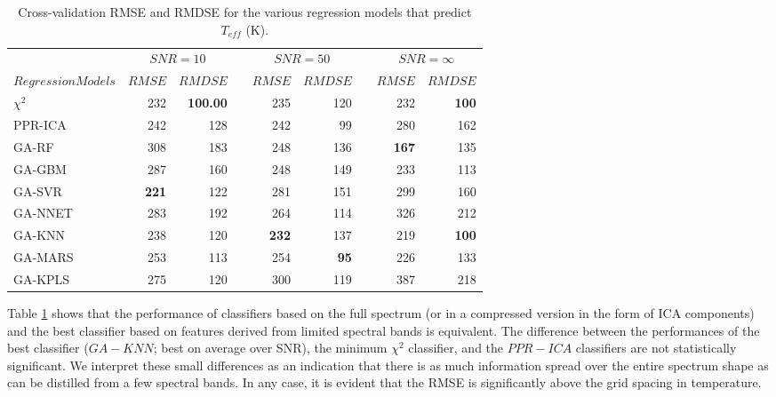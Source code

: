 \newcommand{\ra}[1]{\renewcommand{\arraystretch}{#1}}
\begin{table}\centering
\ra{1.3}
\begin{tabular}{@{}lrrcrrcrr@{}}\toprule
& \multicolumn{2}{c}{$SNR = 10$} & \phantom{ab}& \multicolumn{2}{c}{$SNR = 50$} &
\phantom{ab} & \multicolumn{2}{c}{$SNR = \infty$}\\
\cmidrule{2-3} \cmidrule{5-6} \cmidrule{8-9}
$Regression Models$ & $RMSE$ & $RMDSE$ && $RMSE$ & $RMDSE$ && $RMSE$ & $RMDSE$ \\ \midrule
$\chi^2$      & 232      & \bf{100.00}&& 235      & 120    && 232      & \bf{100} \\
 PPR-ICA      & 242      & 128        && 242      &  99    && 280      & 162 \\
 GA-RF        & 308      & 183        && 248      & 136    && \bf{167} & 135 \\
 GA-GBM       & 287      & 160        && 248      & 149    && 233      & 113 \\
 GA-SVR       & \bf{221} & 122        && 281      & 151    && 299      & 160 \\
 GA-NNET      & 283      & 192        && 264      & 114    && 326      & 212 \\
 GA-KNN       & 238      & 120        && \bf{232} & 137    && 219      & \bf{100}  \\
 GA-MARS      & 253      & 113        && 254      & \bf{95}&& 226      & 133 \\
 GA-KPLS      & 275      & 120        && 300      & 119    && 387      & 218 \\
\bottomrule
\end{tabular}
\caption {Cross-validation RMSE and RMDSE for the various regression
  models that predict $T_{eff}$ (K).}
\label{tab:model_TSD} 
\end{table}

Table \ref{tab:model_TSD} shows that the performance of classifiers
based on the full spectrum (or in a compressed version in the form of
ICA components) and the best classifier based on features derived from
limited spectral bands is equivalent. The difference between the
performances of the best classifier ($GA-KNN$; best on average over
SNR), the minimum $\chi^2$ classifier, and the $PPR-ICA$ classifiers
are not statistically significant. We interpret these small
differences as an indication that there is as much information spread
over the entire spectrum shape as can be distilled from a few spectral
bands. In any case, it is evident that the RMSE is significantly above
the grid spacing in temperature.

